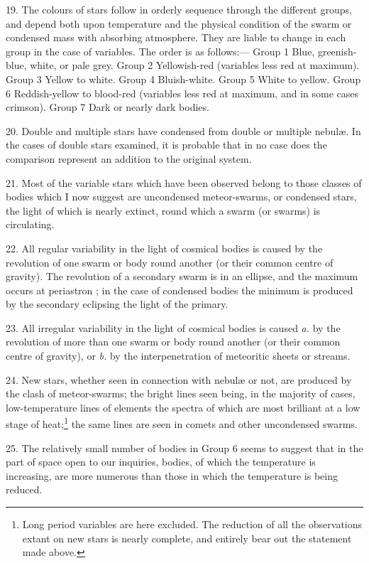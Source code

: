\documentclass[a4paper, 12pt, oneside, polutonikogreek, english]{article}
\begin{document}
19. The colours of stars follow in orderly sequence through the different groups, and depend both upon temperature and the physical condition of the swarm or condensed mass with absorbing atmosphere. They are liable to change in each group in the case of variables. The order is as follows:--- Group 1 Blue, greenish-blue, white, or pale grey. Group 2 Yellowish-red (variables less red at maximum). Group 3 Yellow to white. Group 4 Bluish-white. Group 5 White to yellow. Group 6 Reddish-yellow to blood-red (variables less red at maximum, and in some cases crimson). Group 7 Dark or nearly dark bodies.

20. Double and multiple stars have condensed from double or multiple nebulæ. In the cases of double stars examined, it is probable that in no case does the comparison represent an addition to the original system.

21. Most of the variable stars which have been observed belong to those classes of bodies which I now suggest are uncondensed meteor-swarms, or condensed stars, the light of which is nearly extinct, round which a swarm (or swarms) is circulating.

22. All regular variability in the light of cosmical bodies is caused by the revolution of one swarm or body round another (or their common centre of gravity). The revolution of a secondary swarm is in an ellipse, and the maximum occurs at periastron ; in the case of condensed bodies the minimum is produced by the secondary eclipsing the light of the primary.

23. All irregular variability in the light of cosmical bodies is caused \emph{a.} by the revolution of more than one swarm or body round another (or their common centre of gravity), or \emph{b.} by the interpenetration of meteoritic sheets or streams.

24. New stars, whether seen in connection with nebulæ or not, are produced by the clash of meteor-swarms; the bright lines seen being, in the majority of cases, low-temperature lines of elements the spectra of which are most brilliant at a low stage of heat;\footnote{Long period variables are here excluded. The reduction of all the observations extant on new stars is nearly complete, and entirely bear out the statement made above.} the same lines are seen in comets and other uncondensed swarms.

25. The relatively small number of bodies in Group 6 seems to suggest that in the part of space open to our inquiries, bodies, of which the temperature is increasing, are more numerous than those in which the temperature is being reduced.
\end{document}
